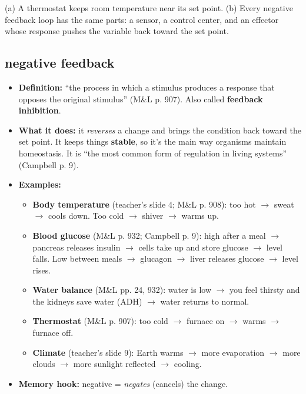 \documentclass[11pt,letterpaper]{article}
\begin{document}
  {(a) A thermostat keeps room temperature near its set point. (b) Every negative feedback loop has the same parts: a sensor, a control center, and an effector whose response pushes the variable back toward the set point.}

\subsection{negative feedback}
\begin{itemize}
  \item \textbf{Definition:} ``the process in which a stimulus produces a response that opposes the original stimulus'' (M\&L p. 907). Also called \textbf{feedback inhibition}.
  \item \textbf{What it does:} it \emph{reverses} a change and brings the condition back toward the set point. It keeps things \textbf{stable}, so it's the main way organisms maintain homeostasis. It is ``the most common form of regulation in living systems'' (Campbell p. 9).
  \item \textbf{Examples:}
  \begin{itemize}
    \item \textbf{Body temperature} (teacher's slide 4; M\&L p. 908): too hot $\rightarrow$ sweat $\rightarrow$ cools down. Too cold $\rightarrow$ shiver $\rightarrow$ warms up.
    \item \textbf{Blood glucose} (M\&L p. 932; Campbell p. 9): high after a meal $\rightarrow$ pancreas releases insulin $\rightarrow$ cells take up and store glucose $\rightarrow$ level falls. Low between meals $\rightarrow$ glucagon $\rightarrow$ liver releases glucose $\rightarrow$ level rises.
    \item \textbf{Water balance} (M\&L pp. 24, 932): water is low $\rightarrow$ you feel thirsty and the kidneys save water (ADH) $\rightarrow$ water returns to normal.
    \item \textbf{Thermostat} (M\&L p. 907): too cold $\rightarrow$ furnace on $\rightarrow$ warms $\rightarrow$ furnace off.
    \item \textbf{Climate} (teacher's slide 9): Earth warms $\rightarrow$ more evaporation $\rightarrow$ more clouds $\rightarrow$ more sunlight reflected $\rightarrow$ cooling.
  \end{itemize}
  \item \textbf{Memory hook:} negative = \emph{negates} (cancels) the change.
\end{itemize}
\end{document}
